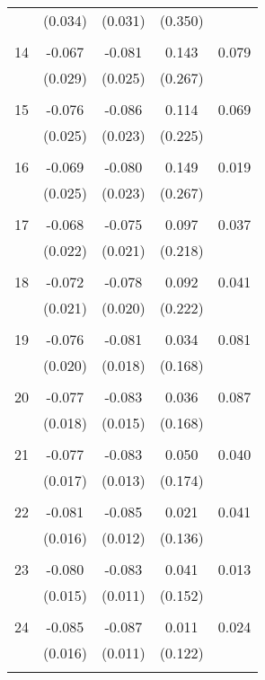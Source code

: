 \begin{tabular}{l*{1}{cccc}}
          & (0.034) & (0.031) & (0.350) & \\
 & & & &\\
  14       & -0.067 & -0.081 & 0.143 & 0.079 \\
          & (0.029) & (0.025) & (0.267) & \\
 & & & &\\
  15       & -0.076 & -0.086 & 0.114 & 0.069 \\
          & (0.025) & (0.023) & (0.225) & \\
 & & & &\\
  16       & -0.069 & -0.080 & 0.149 & 0.019 \\
          & (0.025) & (0.023) & (0.267) & \\
 & & & &\\
  17       & -0.068 & -0.075 & 0.097 & 0.037 \\
          & (0.022) & (0.021) & (0.218) & \\
 & & & &\\
  18       & -0.072 & -0.078 & 0.092 & 0.041 \\
          & (0.021) & (0.020) & (0.222) & \\
 & & & &\\
  19       & -0.076 & -0.081 & 0.034 & 0.081 \\
          & (0.020) & (0.018) & (0.168) & \\
 & & & &\\
  20       & -0.077 & -0.083 & 0.036 & 0.087 \\
          & (0.018) & (0.015) & (0.168) & \\
 & & & &\\
  21       & -0.077 & -0.083 & 0.050 & 0.040 \\
          & (0.017) & (0.013) & (0.174) & \\
 & & & &\\
  22       & -0.081 & -0.085 & 0.021 & 0.041 \\
          & (0.016) & (0.012) & (0.136) & \\
 & & & &\\
  23       & -0.080 & -0.083 & 0.041 & 0.013 \\
          & (0.015) & (0.011) & (0.152) & \\
 & & & &\\
  24       & -0.085 & -0.087 & 0.011 & 0.024 \\
          & (0.016) & (0.011) & (0.122) & \\
 & & & &\\

\end{tabular}
